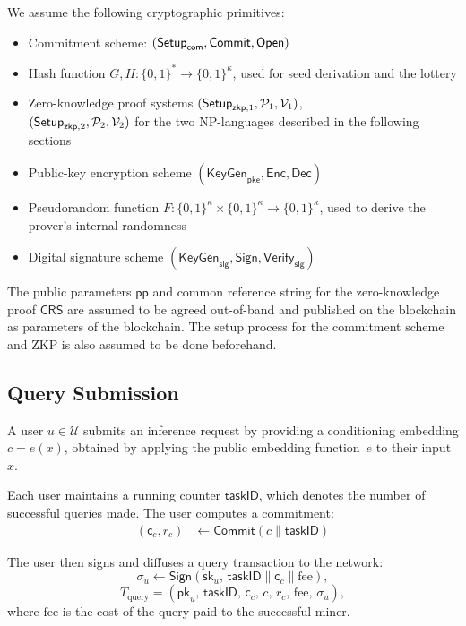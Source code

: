We assume the following cryptographic primitives:
\begin{itemize}
    \item Commitment scheme: $(\mathsf{Setup}_\mathsf{com},\mathsf{Commit}, \mathsf{Open})$
  \item Hash function  $G,H : \{0,1\}^* \to \{0,1\}^\kappa$, used for seed derivation and the lottery
    \item Zero-knowledge proof systems $(\mathsf{Setup}_{\mathsf{zkp},1},\mathcal{P}_1,\mathcal{V}_1)$, \\$(\mathsf{Setup}_{\mathsf{zkp},2},\mathcal{P}_2,\mathcal{V}_2)$ for the two NP-languages described in the following sections
    \item Public-key encryption scheme $(\mathsf{KeyGen}_{\mathsf{pke}},\mathsf{Enc}, \mathsf{Dec})$
    \item Pseudorandom function $F : \{0,1\}^\kappa \times \{0,1\}^\kappa \to \{0,1\}^\kappa$, used to derive the prover's internal randomness 
    \item Digital signature scheme $(\mathsf{KeyGen}_{\mathsf{sig}}, \mathsf{Sign}, \mathsf{Verify}_{\mathsf{sig}})$
\end{itemize}

The public parameters $\mathsf{pp}$ and common reference string for the zero-knowledge proof $\mathsf{CRS}$ are assumed to be agreed out-of-band and published on the blockchain as parameters of the blockchain. The setup process for the commitment scheme and ZKP is also assumed to be done beforehand.

\subsection{Query Submission}

A user $u \in \mathcal{U}$ submits an inference request by providing a conditioning embedding $c = e(x)$, obtained by applying the public embedding function~$e$ to their input~$x$.

Each user maintains a running counter $\mathsf{taskID}$, which denotes the number of successful queries made. The user computes a commitment:
\begin{align}
    (\mathsf{c}_c, r_c) &\leftarrow \mathsf{Commit}(c \parallel \mathsf{taskID})
\end{align}

The user then signs and diffuses a query transaction to the network:
\[
\sigma_u \leftarrow \mathsf{Sign}(\mathsf{sk}_u,\, \mathsf{taskID} \parallel \mathsf{c}_c \parallel \text{fee}),
\]
\[
T_{\text{query}} = (\mathsf{pk}_u,\, \mathsf{taskID},\, \mathsf{c}_c,\, c,\, r_c,\, \text{fee},\, \sigma_u),
\]
where $\text{fee}$ is the cost of the query paid to the successful miner.

